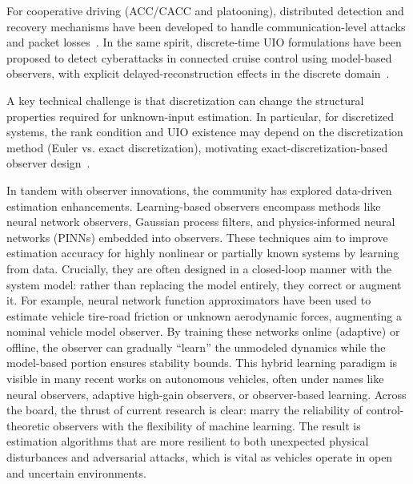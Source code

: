 For cooperative driving (ACC/CACC and platooning), distributed detection and recovery mechanisms have been developed to handle communication-level attacks and packet losses~\cite{mousavinejad2019distributed}. In the same spirit, discrete-time UIO formulations have been proposed to detect cyberattacks in connected cruise control using model-based observers, with explicit delayed-reconstruction effects in the discrete domain~\cite{nguyen2020cyberattack}.

A key technical challenge is that discretization can change the structural properties required for unknown-input estimation. In particular, for discretized systems, the rank condition and UIO existence may depend on the discretization method (Euler vs. exact discretization), motivating exact-discretization-based observer design~\cite{M.Zhang}.

In tandem with observer innovations, the community has explored data-driven estimation enhancements. Learning-based observers encompass methods like neural network observers, Gaussian process filters, and physics-informed neural networks (PINNs) embedded into observers. These techniques aim to improve estimation accuracy for highly nonlinear or partially known systems by learning from data. Crucially, they are often designed in a closed-loop manner with the system model: rather than replacing the model entirely, they correct or augment it. For example, neural network function approximators have been used to estimate vehicle tire-road friction or unknown aerodynamic forces, augmenting a nominal vehicle model observer. By training these networks online (adaptive) or offline, the observer can gradually “learn” the unmodeled dynamics while the model-based portion ensures stability bounds. This hybrid learning paradigm is visible in many recent works on autonomous vehicles, often under names like neural observers, adaptive high-gain observers, or observer-based learning. Across the board, the thrust of current research is clear: marry the reliability of control-theoretic observers with the flexibility of machine learning. The result is estimation algorithms that are more resilient to both unexpected physical disturbances and adversarial attacks, which is vital as vehicles operate in open and uncertain environments.

